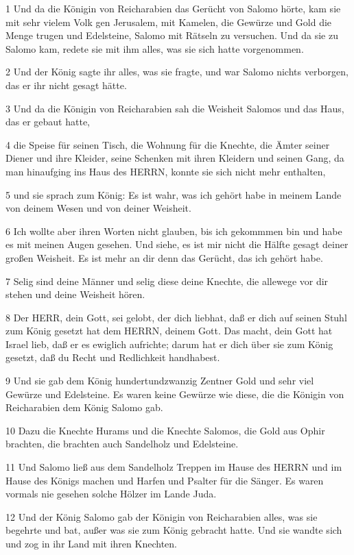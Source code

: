 \par 1 Und da die Königin von Reicharabien das Gerücht von Salomo hörte, kam sie mit sehr vielem Volk gen Jerusalem, mit Kamelen, die Gewürze und Gold die Menge trugen und Edelsteine, Salomo mit Rätseln zu versuchen. Und da sie zu Salomo kam, redete sie mit ihm alles, was sie sich hatte vorgenommen.
\par 2 Und der König sagte ihr alles, was sie fragte, und war Salomo nichts verborgen, das er ihr nicht gesagt hätte.
\par 3 Und da die Königin von Reicharabien sah die Weisheit Salomos und das Haus, das er gebaut hatte,
\par 4 die Speise für seinen Tisch, die Wohnung für die Knechte, die Ämter seiner Diener und ihre Kleider, seine Schenken mit ihren Kleidern und seinen Gang, da man hinaufging ins Haus des HERRN, konnte sie sich nicht mehr enthalten,
\par 5 und sie sprach zum König: Es ist wahr, was ich gehört habe in meinem Lande von deinem Wesen und von deiner Weisheit.
\par 6 Ich wollte aber ihren Worten nicht glauben, bis ich gekommmen bin und habe es mit meinen Augen gesehen. Und siehe, es ist mir nicht die Hälfte gesagt deiner großen Weisheit. Es ist mehr an dir denn das Gerücht, das ich gehört habe.
\par 7 Selig sind deine Männer und selig diese deine Knechte, die allewege vor dir stehen und deine Weisheit hören.
\par 8 Der HERR, dein Gott, sei gelobt, der dich liebhat, daß er dich auf seinen Stuhl zum König gesetzt hat dem HERRN, deinem Gott. Das macht, dein Gott hat Israel lieb, daß er es ewiglich aufrichte; darum hat er dich über sie zum König gesetzt, daß du Recht und Redlichkeit handhabest.
\par 9 Und sie gab dem König hundertundzwanzig Zentner Gold und sehr viel Gewürze und Edelsteine. Es waren keine Gewürze wie diese, die die Königin von Reicharabien dem König Salomo gab.
\par 10 Dazu die Knechte Hurams und die Knechte Salomos, die Gold aus Ophir brachten, die brachten auch Sandelholz und Edelsteine.
\par 11 Und Salomo ließ aus dem Sandelholz Treppen im Hause des HERRN und im Hause des Königs machen und Harfen und Psalter für die Sänger. Es waren vormals nie gesehen solche Hölzer im Lande Juda.
\par 12 Und der König Salomo gab der Königin von Reicharabien alles, was sie begehrte und bat, außer was sie zum König gebracht hatte. Und sie wandte sich und zog in ihr Land mit ihren Knechten.
